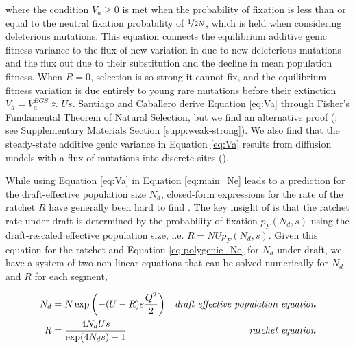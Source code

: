 \documentclass[11pt]{article}
\begin{document}
where the condition $V_a \ge 0$ is met when the probability of fixation is less
than or equal to the neutral fixation probability of $\nicefrac{1}{2N}$, which
is held when considering deleterious mutations. This equation connects the
equilibrium additive genic fitness variance to the flux of new variation in due
to new deleterious mutations and the flux out due to their substitution and the
decline in mean population fitness. When $R=0$, selection is so strong it
cannot fix, and the equilibrium fitness variation is due entirely to young rare
mutations before their extinction $V_a = V_a^{BGS} \approx Us$. Santiago and
Caballero derive Equation \eqref{eq:Va} through Fisher's Fundamental Theorem of
Natural Selection, but we find an alternative proof (\cite{Higgs1995-xc}; see
Supplementary Materials Section \ref{supp:weak-strong}). We also find that the
steady-state additive genic variance in Equation \eqref{eq:Va} results from
diffusion models with a flux of mutations into discrete sites
(\cite{Kimura1969-jw}). 


While using Equation \eqref{eq:Va} in Equation \eqref{eq:main_Ne} leads to a
prediction for the draft-effective population size $N_d$, closed-form
expressions for the rate of the ratchet $R$ have generally been hard to find
\parencite{Haigh1978-gt,Higgs1995-xc,Gessler1995-hz}. The key insight of
\textcite{Santiago2016-mu} is that the ratchet rate under draft is determined
by the probability of fixation $p_F(N_d, s)$
\parencite{Kimura1962-su,Malecot1952-qh} using the draft-rescaled effective
population size, i.e. $R = N U p_F(N_d, s)$. Given this equation for the
ratchet and Equation \eqref{eq:polygenic_Ne} for $N_d$ under draft, we have a
system of two non-linear equations that can be solved numerically for $N_d$ and
$R$ for each segment,

\begin{align}
  \label{eq:main_eqns}
  N_d &= N \exp \left( -(U-R)s \frac{Q^2}{2} \right) & \text{\emph{draft-effective population equation}} \\
  R &= \frac{4N_d U s}{\exp(4 N_d s)-1}  & \text{\emph{ratchet equation}}
\end{align}
%
\end{document}

